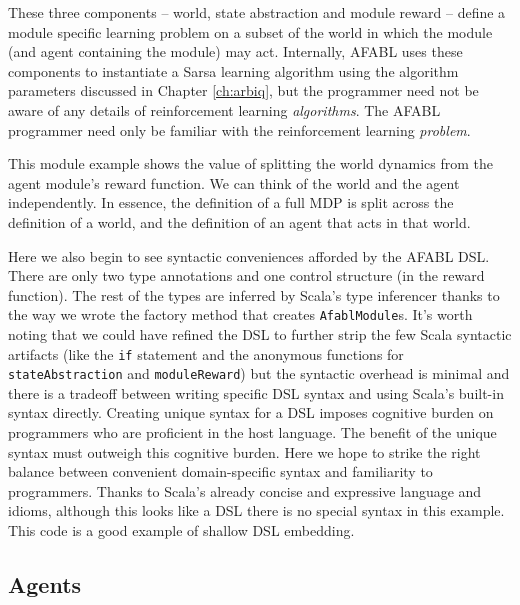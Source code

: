 These three components -- world, state abstraction and module reward -- define a module specific learning problem on a subset of the world in which the module (and agent containing the module) may act. Internally, AFABL uses these components to instantiate a Sarsa learning algorithm using the algorithm parameters discussed in Chapter \ref{ch:arbiq}, but the programmer need not be aware of any details of reinforcement learning {\it algorithms}. The AFABL programmer need only be familiar with the reinforcement learning {\it problem}.

This module example shows the value of splitting the world dynamics from the agent module's reward function. We can think of the world and the agent independently. In essence, the definition of a full MDP is split across the definition of a world, and the definition of an agent that acts in that world.

Here we also begin to see syntactic conveniences afforded by the AFABL DSL. There are only two type annotations and one control structure (in the reward function). The rest of the types are inferred by Scala's type inferencer thanks to the way we wrote the factory method that creates {\tt AfablModule}s. It's worth noting that we could have refined the DSL to further strip the few Scala syntactic artifacts (like the {\tt if} statement and the anonymous functions for {\tt stateAbstraction} and {\tt moduleReward}) but the syntactic overhead is minimal and there is a tradeoff between writing specific DSL syntax and using Scala's built-in syntax directly. Creating unique syntax for a DSL imposes cognitive burden on programmers who are proficient in the host language. The benefit of the unique syntax must outweigh this cognitive burden. Here we hope to strike the right balance between convenient domain-specific syntax and familiarity to programmers. Thanks to Scala's already concise and expressive language and idioms, although this looks like a DSL there is no special syntax in this example. This code is a good example of shallow DSL embedding.

\subsection{Agents}\label{sec:afabl-agents}

